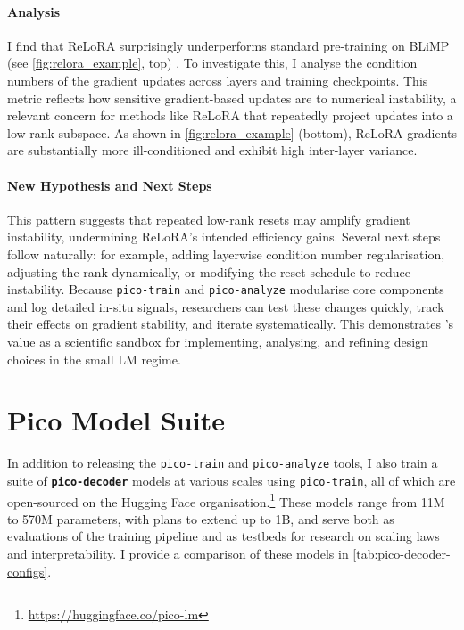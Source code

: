 \paragraph{Analysis} I find that ReLoRA surprisingly underperforms standard pre-training on BLiMP (see \cref{fig:relora_example}, top) \citep{warstadt2020blimp}. To investigate this, I analyse the condition numbers of the gradient updates across layers and training checkpoints. This metric reflects how sensitive gradient-based updates are to numerical instability, a relevant concern for methods like ReLoRA that repeatedly project updates into a low-rank subspace. As shown in \cref{fig:relora_example} (bottom), ReLoRA gradients are substantially more ill-conditioned and exhibit high inter-layer variance. 


\paragraph{New Hypothesis and Next Steps}
This pattern suggests that repeated low-rank resets may amplify gradient instability, undermining ReLoRA's intended efficiency gains. Several next steps follow naturally: for example, adding layerwise condition number regularisation, adjusting the rank dynamically, or modifying the reset schedule to reduce instability. Because \texttt{pico-train} and \texttt{pico-analyze} modularise core components and log detailed in-situ signals, researchers can test these changes quickly, track their effects on gradient stability, and iterate systematically. This demonstrates \pico's value as a scientific sandbox for implementing, analysing, and refining design choices in the small LM regime.

\section{Pico Model Suite}
\label{sec:pico-model-suite}

In addition to releasing the \texttt{pico-train} and \texttt{pico-analyze} tools, I also train a suite of \textbf{\texttt{pico-decoder}} models at various scales using \texttt{pico-train}, all of which are open-sourced on the Hugging Face organisation.\footnote{\url{https://huggingface.co/pico-lm}} These models range from 11M to 570M parameters, with plans to extend up to 1B, and serve both as evaluations of the training pipeline and as testbeds for research on scaling laws and interpretability. I provide a comparison of these models in \cref{tab:pico-decoder-configs}.

